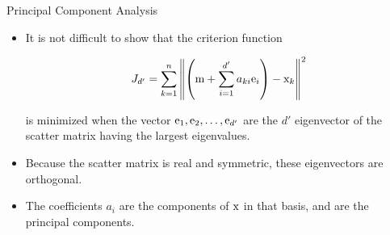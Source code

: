 \begin{frame}{Principal Component Analysis}
\begin{itemize}
\setlength{\itemsep}{12pt}
\item It is not difficult to show that the criterion function
\begin{footnotesize}
\begin{equation}
{J_{d'}} = \sum\limits_{k = 1}^n {{{\left\| {\left( {{\rm m} + \sum\limits_{i = 1}^{d'} {{a_{ki}}{{\rm e}_i}} } \right) - {{\rm x}_k}} \right\|}^2}} \nonumber
\end{equation}
\end{footnotesize}
is minimized when the vector ${\rm e}_1,{\rm e}_2,\ldots,{\rm e}_{d'}$ are the $d'$ eigenvector of the scatter matrix having the largest eigenvalues.
\item Because the scatter matrix is real and symmetric, these eigenvectors are orthogonal.
\item The coefficients $a_i$ are the components of ${\rm x}$ in that basis, and are the principal components.
\end{itemize}
\end{frame}




